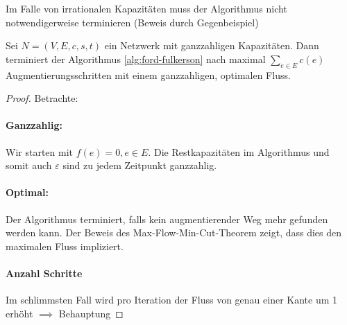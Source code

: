 \begin{remark}
Im Falle von irrationalen Kapazitäten muss der Algorithmus nicht notwendigerweise terminieren (Beweis durch Gegenbeispiel)
\end{remark}
\begin{theorem}
Sei $N=(V,E,c,s,t)$ ein Netzwerk mit ganzzahligen Kapazitäten. Dann terminiert der Algorithmus \ref{alg:ford-fulkerson} nach maximal $\sum_{e \in E}c(e)$ Augmentierungsschritten mit einem ganzzahligen, optimalen Fluss.
\end{theorem}
\begin{proof} Betrachte:
\paragraph{Ganzzahlig:} Wir starten mit $f(e)=0, e \in E$. Die Restkapazitäten im Algorithmus und somit auch $\varepsilon $ sind zu jedem Zeitpunkt ganzzahlig.
\paragraph{Optimal:} Der Algorithmus terminiert, falls kein augmentierender Weg mehr gefunden werden kann. Der Beweis des Max-Flow-Min-Cut-Theorem zeigt, dass dies den maximalen Fluss impliziert.
\paragraph{Anzahl Schritte} Im schlimmsten Fall wird pro Iteration der Fluss von genau einer Kante um 1 erhöht $\implies$ Behauptung 
\end{proof}

